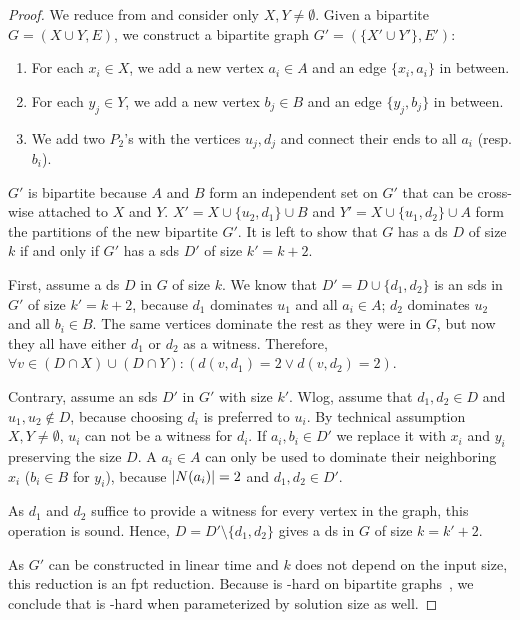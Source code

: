 \begin{proof}
    We reduce from \dom and consider only $X, Y \neq \emptyset$.
    Given a bipartite $G = ( X \cup Y, E)$, we construct a bipartite graph $G' = (\{X' \cup Y'\},E')$:
    \begin{enumerate}[topsep=0pt,itemsep=0ex,partopsep=1ex,parsep=1ex]
        \item For each $x_i \in X$, we add a new vertex $a_i \in A$  and an edge $\{x_i, a_i\}$ in between. 
        \item For each $y_j \in Y$, we add a new vertex $b_j \in B$ and an edge $\{y_j, b_j\}$ in between.
        \item We add two $P_2$'s with the vertices $u_j,d_j$ and connect their ends to all $a_i$ (resp. $b_i$).
    \end{enumerate}

    $G'$ is bipartite because $A$ and $B$ form an independent set on $G'$ that can be cross-wise attached to $X$ and $Y$. 
    $X' = X \cup \{u_2,d_1\} \cup B$ and $Y' = X \cup \{u_1,d_2\} \cup A$ form the partitions of the new bipartite $G'$.
    It is left to show that $G$ has a ds $D$ of size $k$ if and only if $G'$ has a sds $D'$ of size $k' = k + 2$.
 
    First, assume a ds $D$ in $G$ of size $k$. 
    We know that $D' = D\cup \{d_1,d_2\}$ is an sds in $G'$ of size $k' = k + 2$, because $d_1$ dominates $u_1$ and all $a_i \in A$; $d_2$ dominates $u_2$ and all $b_i \in B$. 
    The same vertices dominate the rest as they were in $G$, but now they all have either $d_1$ or $d_2$ as a witness.
    Therefore,  $\forall v \in (D \cap X) \cup (D \cap Y): (d(v, d_1) = 2 \vee d(v, d_2)=2)$.

    Contrary, assume an sds $D'$ in $G'$ with size $k'$. 
    Wlog, assume that $d_1, d_2 \in D$ and $u_1,u_2 \notin D$, because choosing $d_i$ is preferred to $u_i$.
    By technical assumption $X, Y \neq \emptyset$, $u_i$ can not be a witness for $d_i$.
    If $a_i,b_i \in D'$ we replace it with $x_i$ and $y_i$ preserving the size $D$.
    A $a_i \in A$ can only be used to dominate their neighboring $x_i$ ($b_i \in B$ for $y_i$), because $\abs{N(a_i)} = 2$ and $d_1,d_2\in D'$.

    As $d_1$ and $d_2$ suffice to provide a witness for every vertex in the graph, this operation is sound.
    Hence, $D = D' \setminus \{ d_1,d_2\}$ gives a ds in $G$ of size $ k = k' + 2$.

    As $G'$ can be constructed in linear time and $k$ does not depend on the input size, this reduction is an fpt reduction.  
    Because \dom is \WTWOhs-hard on bipartite graphs~\cite[Th. 1]{Raman2008}, we conclude that \sdom is \WTWOhs-hard when parameterized by solution size as well.
\end{proof}

